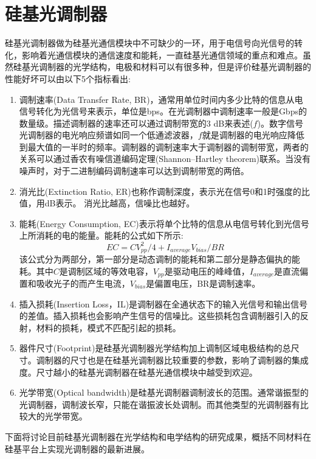 \section{硅基光调制器}
硅基光调制器做为硅基光通信模块中不可缺少的一环，用于电信号向光信号的转化，影响着光通信模块的通信速度和能耗，一直硅基光通信领域的重点和难点。虽然硅基光调制器的光学结构，电极和材料可以有很多种，但是评价硅基光调制器的性能好坏可以由以下5个指标看出:
\begin{enumerate}[(1)]
	\item 调制速率(Data Transfer Rate, BR)，通常用单位时间内多少比特的信息从电信号转化为光信号来表示，单位是bps。在光调制器中调制速率一般是Gbps的数量级。描述调制器的速率还可以通过调制带宽的3 dB来表述($f$)。数字信号光调制器的电光响应频谱如同一个低通滤波器，$f$就是调制器的电光响应降低到最大值的一半时的频率。调制器的调制速率大于调制器的调制带宽，两者的关系可以通过香农有噪信道编码定理(Shannon–Hartley theorem)联系。当没有噪声时，对于二进制编码调制速率可以达到调制带宽的两倍。
	\item 消光比(Extinction Ratio, ER)也称作调制深度，表示光在信号0和1时强度的比值，用dB表示。 消光比越高，信噪比也越好。
	\item 能耗(Energy Consumption, EC)表示将单个比特的信息从电信号转化到光信号上所消耗的电的能量。能耗的公式如下所示:
		\begin{equation}
		\label{Equ:EC}
		EC = CV_{pp}^{2}/4 + I_{average}V_{bias}/BR
		\end{equation}
	该公式分为两部分，第一部分是动态调制的能耗和第二部分是静态偏执的能耗。其中$C$是调制区域的等效电容，$V_{pp}$是驱动电压的峰峰值，$I_{average}$是直流偏置和吸收光子的而产生电流，$V_{bias}$是偏置电压，BR是调制速率。
	\item 插入损耗(Insertion Loss，IL)是调制器在全通状态下的输入光信号和输出信号的差值。插入损耗也会影响产生信号的信噪比。这些损耗包含调制器引入的反射，材料的损耗，模式不匹配引起的损耗。
	\item 器件尺寸(Footprint)是硅基光调制器光学结构加上调制区域电极结构的总尺寸。调制器的尺寸也是在硅基光调制器比较重要的参数，影响了调制器的集成度。尺寸越小的硅基光调制器在硅基光通信模块中越受到欢迎。
	\item 光学带宽(Optical bandwidth)是硅基光调制器调制波长的范围。通常谐振型的光调制器，调制波长窄，只能在谐振波长处调制。而其他类型的光调制器有比较大的光学带宽。	
\end{enumerate}

下面将讨论目前硅基光调制器在光学结构和电学结构的研究成果，概括不同材料在硅基平台上实现光调制器的最新进展。

